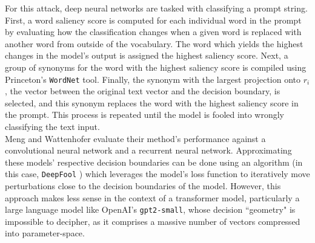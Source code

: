 \documentclass{article}
\begin{document}
For this attack, deep neural networks are tasked with classifying a prompt string. First, a word saliency score is computed for each individual word in the prompt by evaluating how the classification changes when a given word is replaced with another word from outside of the vocabulary. The word which yields the highest changes in the model's output is assigned the highest saliency score. Next, a group of synonyms for the word with the highest saliency score is compiled using Princeton's \texttt{WordNet} tool. Finally, the synonym with the largest projection onto $r_i$, the vector between the original text vector and the decision boundary, is selected, and this synonym replaces the word with the highest saliency score in the prompt. This process is repeated until the model is fooled into wrongly classifying the text input. \\ 


Meng and Wattenhofer evaluate their method's performance against a convolutional neural network and a recurrent neural network. Approximating these models' respective decision boundaries can be done using an algorithm (in this case, \texttt{DeepFool} \citep{deepfool}) which leverages the model's loss function to iteratively move perturbations close to the decision boundaries of the model. However, this approach makes less sense in the context of a transformer model, particularly a large language model like OpenAI's \texttt{gpt2-small}, whose decision ``geometry" is impossible to decipher, as it comprises a massive number of vectors compressed into parameter-space.\\ 
\end{document}
